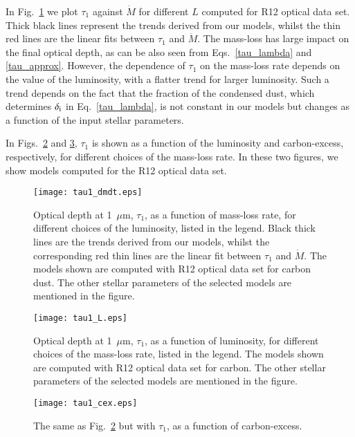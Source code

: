 \documentclass[useAMS,usenatbib]{mn2e/mn2e}
\begin{document}
In Fig.~\ref{tau1_dmdt} we plot $\tau_1$ against $\dot{M}$ for different $L$ computed for R12 optical data set. Thick black lines represent the trends derived from our models, whilst the thin red lines are the linear fits between $\tau_1$ and $\dot{M}$. %
The mass-loss has large impact on the final optical depth, as can be also seen from Eqs.~\ref{tau_lambda} and \ref{tau_approx}.
However, the dependence of $\tau_1$ on the mass-loss rate depends on the value of the luminosity, with a flatter trend for larger luminosity.
Such a trend depends on the fact that the fraction of the condensed dust, which determines $\delta_{\rm i}$ in Eq.~\ref{tau_lambda}, is not constant in our models but changes as a function of the input stellar parameters. 

In Figs.~\ref{tau1_L} and \ref{tau1_CO}, $\tau_1$ is shown as a function of the luminosity and carbon-excess, respectively, for different choices of the mass-loss rate. In these two figures, we show models computed for the R12 optical data set.

        \begin{figure}
\texttt{[image: tau1\_dmdt.eps]}
        \caption{Optical depth at 1~$\mu$m, $\tau_1$, as a function of mass-loss rate, for different choices of the luminosity, listed in the legend. Black thick lines are the trends derived from our models, whilst the corresponding red thin lines are the linear fit between $\tau_1$ and $\dot{M}$. The models shown are computed with R12 optical data set for carbon dust. The other stellar parameters of the selected models are mentioned in the figure.}
        \label{tau1_dmdt}
        \end{figure}
        
        \begin{figure}
\texttt{[image: tau1\_L.eps]}
        \caption{Optical depth at 1~$\mu$m, $\tau_1$, as a function of luminosity, for different choices of the mass-loss rate, listed in the legend. The models shown are computed with R12 optical data set for carbon. The other stellar parameters of the selected models are mentioned in the figure.}
        \label{tau1_L}
        \end{figure}
        
        \begin{figure}
\texttt{[image: tau1\_cex.eps]}
        \caption{The same as Fig.~\ref{tau1_L} but with $\tau_1$, as a function of carbon-excess.}
        \label{tau1_CO}
        \end{figure}
        
\end{document}
